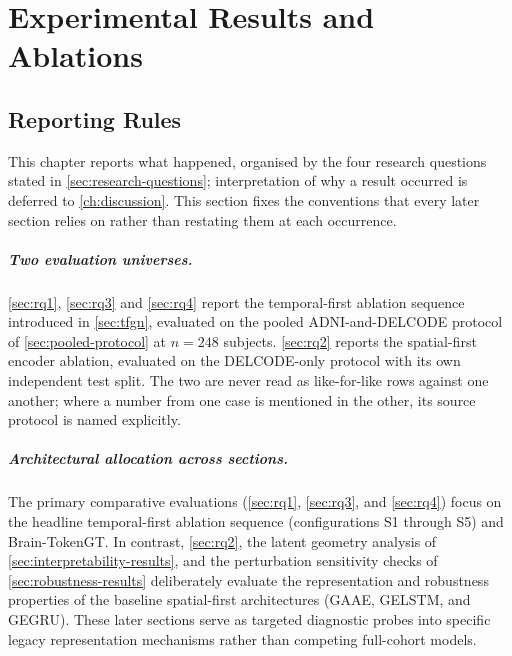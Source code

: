 
\chapter{Experimental Results and Ablations}\label{ch:results}


\section{Reporting Rules}\label{sec:reporting-rules}

This chapter reports what happened, organised by the four research questions stated in
\autoref{sec:research-questions}; interpretation of why a result occurred is deferred to
\autoref{ch:discussion}. This section fixes the conventions that every later section
relies on rather than restating them at each occurrence.

\paragraph{Two evaluation universes.} \autoref{sec:rq1}, \autoref{sec:rq3} and
\autoref{sec:rq4} report the temporal-first ablation sequence introduced in
\autoref{sec:tfgn}, evaluated on the pooled \ac{ADNI}-and-\ac{DELCODE} protocol of
\autoref{sec:pooled-protocol} at $n=248$ subjects. \autoref{sec:rq2} reports the
spatial-first encoder ablation, evaluated on the \ac{DELCODE}-only protocol with its own
independent test split. The two are never read as like-for-like rows against one another;
where a number from one case is mentioned in the other, its source protocol is named
explicitly.

\paragraph{Architectural allocation across sections.} The primary comparative evaluations (\autoref{sec:rq1}, \autoref{sec:rq3}, and \autoref{sec:rq4}) focus on the headline temporal-first ablation sequence (configurations S1 through S5) and Brain-TokenGT. In contrast, \autoref{sec:rq2}, the latent geometry analysis of \autoref{sec:interpretability-results}, and the perturbation sensitivity checks of \autoref{sec:robustness-results} deliberately evaluate the representation and robustness properties of the baseline spatial-first architectures (\ac{GAAE}, \ac{GELSTM}, and \ac{GEGRU}). These later sections serve as targeted diagnostic probes into specific legacy representation mechanisms rather than competing full-cohort models.


